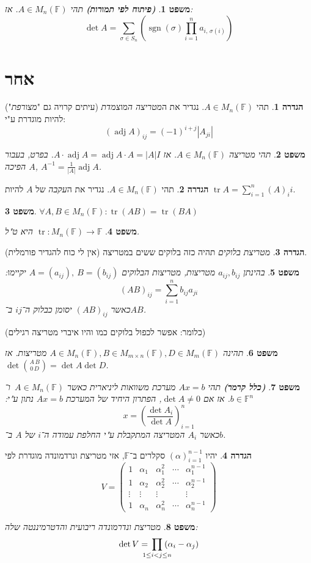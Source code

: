 \documentclass[]{article}
\DeclareMathOperator{\sgn}    {sgn}
\DeclareMathOperator{\adj}    {adj}
\DeclareMathOperator{\tr}     {tr}
\newcommand\F         {\mathbb{F}}
\newcommand\co        {\colon}
\newcommand\mat[2]    {M_{#1\times#2}}
\newcommand\gmat      {\mat{m}{n}(\F)}
\newcommand\pms[1]    {\begin{pmatrix}
		#1
\end{pmatrix}}
\newcommand\ag        {\alpha}
\newcommand\sg        {\sigma}
\newcommand\op    {^{-1}}
\newcommand\cl [1]    {\left ( #1 \right )}
\newtheorem{Theorem}{משפט}
\theoremstyle{definition}
\newtheorem{definition}{הגדרה}
\newcommand\theo  [1] {\begin{Theorem}#1\end{Theorem}}
\newcommand\defi  [1] {\begin{definition}#1\end{definition}}
\begin{document}
\begin{multicols}{2}
		\begin{Theorem}\textit{\textbf{(פיתוח לפי תמורות)}}
			תהי $A \in M_n(\F)$. אז: 
			\[ \det A = \sum_{\sg \in S_n} \cl{\sgn(\sg) \prod_{i = 1}^{n} a_{i,\,\sg(i)}} \]
		\end{Theorem}
		
		
		\section{אחר}
		\defi{תהי $A \in M_n(\F)$. נגדיר את ה\textit{מטריצה המוצמדת} (עיתים קרויה גם "\textit{מצורפת}") להיות מוגדרת ע"י: 
		\[ (\adj A)_{ij} = (-1)^{i + j}|A_{ji}| \]}
		\theo{תהי מטריצה $A \in M_n(\F)$. אז $A \cdot \adj A = \adj A \cdot A = |A| I$. בפרט, בעבור $A$ הפיכה, $A\op = \frac{1}{|A|} \adj A$. }
		
		\defi{תהי $A \in M_n(\F)$. נגדיר את ה\textit{עקבה} של $A$ להיות $\tr A = \sum_{i = 1}^{n} (A)_ii$. }
		\theo{\hfil $\forall A, B \in M_n(\F) \co \tr(AB) = \tr(BA)$}
		\theo{$\tr \co M_n(\F) \to \F$ היא ט"ל. }
		
		\defi{\textit{מטריצת בלוקים} תהיה כזה בלוקים ששים במטריצה (אין לי כוח להגדיר פורמלית). }
		\theo{בהינתן $a_{ij}, b_{ij}$ מטריצות, מטריצות הבלוקים $A = (a_{ij}), \ B = (b_{ij})$ יקיימו: 
		\[ (AB)_{ij} = \sum_{i = 1}^{n} b_{ij}a_{ji} \]
		כאשר $(AB)_{ij}$ יסומן כבלוק ה־$ij$ ב־$AB$. 
		}
		(כלומר: אפשר לכפול בלוקים כמו והיו איברי מטריצה רגילים)
		\theo{תהינה $A \in M_n(\F), B \in \gmat, D \in M_m(\F)$ מטריצות. אז $\det \binom{A \, B}{0\, D} = \det A \det D$. }
		
		\begin{Theorem}\textit{\textbf{(כלל קרמר)}}
			תהי $Ax = b$ מערכת משוואות ליניארית כאשר $A \in M_n(\F)$\ ו־$b \in \F^n$. אז אם $\det A \neq 0$, הפתרון היחיד של המערכת $Ax = b$ נתון ע"י: 
			\[ x = \cl{\frac{\det A_i}{\det A}}_{i = 1}^{n} \]
			כאשר $A_i$ המטריצה המתקבלת ע"י החלפת עמודה ה־$i$ של $A$ ב־$b$. 
		\end{Theorem}
		\defi{יהיו $(\ag)_{i = 1}^{n - 1}$ סקלרים ב־$\F$, אזי מטריצת ונרדמונדה מוגדרת לפי
			\[ V = \pms{1 & \ag_1 & \ag_1^2 & \cdots & \ag_1^{n - 1} \\ 1 & \ag_2 & \ag_2^2 & \cdots & \ag_2^{n - 1} \\ \vdots & \vdots  & \vdots && \vdots \\ 1 & \ag_n & \ag_n^{2} & \cdots & \ag_n^{n - 1}} \]
		}
		\theo{מטריצת ונדרמונדה ריבועית והדטרמיננטה שלה:
			\[\det V = \, \prod_{\mathclap{1 \le i < j \le n}}\:(\ag_i - \ag_j)\]\
		}
		
		
		
	\end{multicols}
	{\let\newpage\relax\maketitle}
	\maketitle
	
\end{document}
